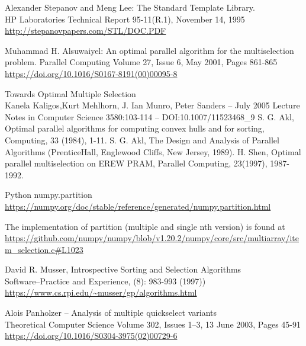 \renewcommand{\addcontentsline}[3]{}%
\begin{thebibliography}{9}

Alexander Stepanov and Meng Lee: The Standard Template Library.\\HP Laboratories Technical Report 95-11(R.1), November 14, 1995 \\
\url{http://stepanovpapers.com/STL/DOC.PDF }

Muhammad H. Alsuwaiyel: An optimal parallel algorithm for the multiselection problem. 
Parallel Computing Volume 27, Issue 6, May 2001, Pages 861-865\\
\url{https://doi.org/10.1016/S0167-8191(00)00095-8 }

Towards Optimal Multiple Selection\\ 
Kanela Kaligos,Kurt Mehlhorn, J. Ian Munro, Peter Sanders --
July 2005 Lecture Notes in Computer Science 3580:103-114 --
DOI:10.1007/11523468_9
S. G. Akl, Optimal parallel algorithms for computing convex hulls and for sorting, Computing, 33 (1984), 1-11.
S. G. Akl, The Design and Analysis of Parallel Algorithms (PrenticeHall, Englewood Cliffs, New Jersey, 1989).
H. Shen, Optimal parallel multiselection on EREW PRAM, Parallel Computing, 23(1997), 1987-1992.

Python numpy.partition \\
\url{https://numpy.org/doc/stable/reference/generated/numpy.partition.html }

The implementation of partition (multiple and single nth version) is found at
{\footnotesize \url{https://github.com/numpy/numpy/blob/v1.20.2/numpy/core/src/multiarray/item_selection.c#L1023 }}

David R. Musser, Introspective Sorting and Selection Algorithms\\
Software--Practice and Experience, (8): 983-993 (1997))\\
\url{https://www.cs.rpi.edu/~musser/gp/algorithms.html }

Alois Panholzer --
Analysis of multiple quickselect variants\\
Theoretical Computer Science
Volume 302, Issues 1–3, 13 June 2003, Pages 45-91\\
\url{https://doi.org/10.1016/S0304-3975(02)00729-6 }


\end{thebibliography}
